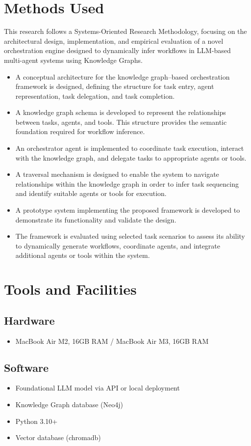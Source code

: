\section{Methods Used}
This research follows a Systems-Oriented Research Methodology, focusing on the architectural design, implementation, and empirical evaluation of a novel orchestration engine designed to dynamically infer workflows in LLM-based multi-agent systems using Knowledge Graphs.
\begin{itemize}
    \item A conceptual architecture for the knowledge graph–based orchestration framework is designed, defining the structure for task entry, agent representation, task delegation, and task completion.
    \item A knowledge graph schema is developed to represent the relationships between tasks, agents, and tools. This structure provides the semantic foundation required for workflow inference.
    \item An orchestrator agent is implemented to coordinate task execution, interact with the knowledge graph, and delegate tasks to appropriate agents or tools.
    \item A traversal mechanism is designed to enable the system to navigate relationships within the knowledge graph in order to infer task sequencing and identify suitable agents or tools for execution.
    \item A prototype system implementing the proposed framework is developed to demonstrate its functionality and validate the design.
    \item The framework is evaluated using selected task scenarios to assess its ability to dynamically generate workflows, coordinate agents, and integrate additional agents or tools within the system.
\end{itemize}



\section{Tools and Facilities}
\subsection{Hardware}
\begin{itemize}
    \item MacBook Air M2, 16GB RAM / MacBook Air M3, 16GB RAM
\end{itemize}
\subsection{Software}
\begin{itemize}
    \item Foundational LLM model via API or local deployment
    \item Knowledge Graph database (Neo4j)
    \item Python 3.10+
    \item Vector database (chromadb)
\end{itemize}
    

